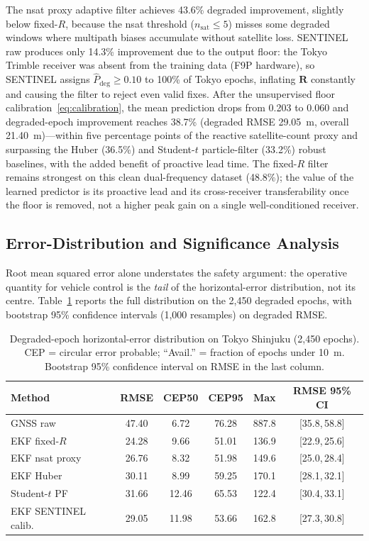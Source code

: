 \documentclass[journal]{IEEEtran}
\newcommand{\Pdeg}{\hat{P}_{\mathrm{deg}}}
\newcommand{\Rmat}{\mathbf{R}}
\begin{document}
The nsat proxy adaptive filter achieves 43.6\% degraded improvement, slightly
below fixed-$R$, because the nsat threshold ($n_\text{sat} \leq 5$) misses
some degraded windows where multipath biases accumulate without satellite
loss.  SENTINEL raw produces only 14.3\% improvement due to the output floor:
the Tokyo Trimble receiver was absent from the training data (F9P hardware),
so SENTINEL assigns $\Pdeg \geq 0.10$ to 100\% of Tokyo epochs, inflating
$\Rmat$ constantly and causing the filter to reject even valid fixes.  After
the unsupervised floor calibration~\eqref{eq:calibration}, the mean prediction
drops from 0.203 to 0.060 and degraded-epoch improvement reaches
38.7\% (degraded RMSE 29.05~m, overall 21.40~m)---within five percentage points
of the reactive satellite-count proxy and surpassing the Huber (36.5\%) and
Student-$t$ particle-filter (33.2\%) robust baselines, with the added benefit of
proactive lead time. The fixed-$R$ filter remains strongest on this clean
dual-frequency dataset (48.8\%); the value of the learned predictor is its
proactive lead and its cross-receiver transferability once the floor is removed,
not a higher peak gain on a single well-conditioned receiver.

\subsection{Error-Distribution and Significance Analysis}
\label{subsec:nav_metrics}

Root mean squared error alone understates the safety argument: the operative
quantity for vehicle control is the \emph{tail} of the horizontal-error
distribution, not its centre.  Table~\ref{tab:nav_metrics} reports the full
distribution on the 2{,}450 degraded epochs, with bootstrap 95\% confidence
intervals (1{,}000 resamples) on degraded RMSE.

\begin{table}[h]
\caption{Degraded-epoch horizontal-error distribution on Tokyo Shinjuku
(2{,}450 epochs). CEP = circular error probable; ``Avail.'' = fraction of
epochs under 10~m. Bootstrap 95\% confidence interval on RMSE in the last column.}
\label{tab:nav_metrics}
\begin{tabular}{@{}lccccc@{}}
\toprule
Method & RMSE & CEP50 & CEP95 & Max & RMSE 95\% CI \\
\midrule
GNSS raw            & 47.40 & 6.72  & 76.28 & 887.8 & [35.8,\,58.8] \\
EKF fixed-$R$       & 24.28 & 9.66  & 51.01 & 136.9 & [22.9,\,25.6] \\
EKF nsat proxy      & 26.76 & 8.32  & 51.98 & 149.6 & [25.0,\,28.4] \\
EKF Huber           & 30.11 & 8.99  & 59.25 & 170.1 & [28.1,\,32.1] \\
Student-$t$ PF      & 31.66 & 12.46 & 65.53 & 122.4 & [30.4,\,33.1] \\
EKF SENTINEL calib. & 29.05 & 11.98 & 53.66 & 162.8 & [27.3,\,30.8] \\
\bottomrule
\end{tabular}
\end{table}
\end{document}
